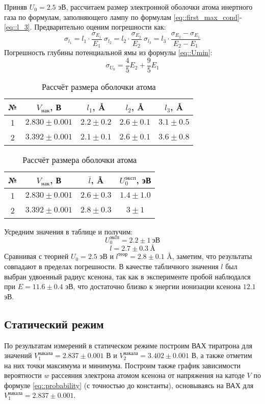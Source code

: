 Приняв $U_0 = 2.5$ эВ, рассчитаем размер электронной оболочки атома инертного
газа по формулам, заполняющего лампу по формулам
\eqref{eq::first_max_cond}-\eqref{eq::l_3}. Предварительно оценим погрешности
как:
\[
  \sigma_{l_1} = l_1 \cdot \frac{\sigma_{E_1}}{E_1} 
  \: 
  \sigma_{l_2} = l_2 \cdot \frac{\sigma_{E_2}}{E_2}
  \: 
  \sigma_{l_3} = l_3 \cdot \frac{\sigma_{E_2} - \sigma_{E_1}}{E_2 - E_1}
\]
Погрешность глубины потенциальной ямы из формулы \eqref{eq::Umin}:
\[
  \sigma_{U_0} = \frac{4}{5} E_2 + \frac{9}{5} E_1
\]
\newpage
\begin{table}[h!]
  \centering
  \caption{Рассчёт размера оболочки атома}
  \begin{tabular}{|c|c|c|c|c|}
    \hline
    № & $V_{нак}$, В & $l_1$, \AA & $l_2$, \AA & $l_3$, \AA \\ 
    \hline
    1 & $2.830 \pm 0.001$ & $2.2 \pm 0.2$ & $ 2.6 \pm 0.1$ & $3.1 \pm 0.5$ \\ \hline
    2 & $3.392 \pm 0.001$ & $2.1 \pm 0.1$ & $ 2.6 \pm 0.1$ & $ 3.6 \pm 0.8$ \\ 
    \hline
  \end{tabular}
  \begin{tabular}{|c|c|c|c|}
    \hline
    № & $V_{нак}$, В & $\overline{l}$, \AA & $U_0^{эксп}$, эВ\\
    \hline
    1 & $2.830 \pm 0.001$ & $2.6 \pm 0.3$ & $ 1.4 \pm 1.0$\\\hline
    2 & $3.392 \pm 0.001$ & $2.8 \pm 0.3$ & $ 3 \pm 1$\\
    \hline
  \end{tabular}
\end{table}
Усредним значения в таблице и получим:
\[
  U_0^{эксп} = 2.2 \pm 1 \: \text{эВ}
\]
\[
  l = 2.7 \pm 0.3 \: \text{\AA}
\]
Сравнивая с теорией $U_0 = 2.5$ эВ и $l^{теор} = 2.8 \pm 0.1$ \AA, заметим, что
результаты совпадают в пределах погрешности. В качестве табличного значения $l$
был выбран удвоенный радиус ксенона, так как в эксперименте пробой наблюдался
при $E = 11.6 \pm 0.4$ эВ, что достаточно близко к энергии ионизации ксенона
$12.1$ эВ.

\subsection{Статический режим}

По результатам измерений в статическом режиме построим ВАХ тиратрона для
значений $V_1^{накала} = 2.837 \pm 0.001$ В и $V_2^{накала} = 3.402 \pm 0.001$
В, а также отметим на них точки максимума и минимума. Построим также график
зависимости вероятности $w$ рассеяния электрона атомом ксенона от напряжения на
катоде $V$ по формуле \eqref{eq::probability} (с точностью до константы), основываясь на ВАХ для $V_1^{накала} =
2.837 \pm 0.001$.
\newpage

